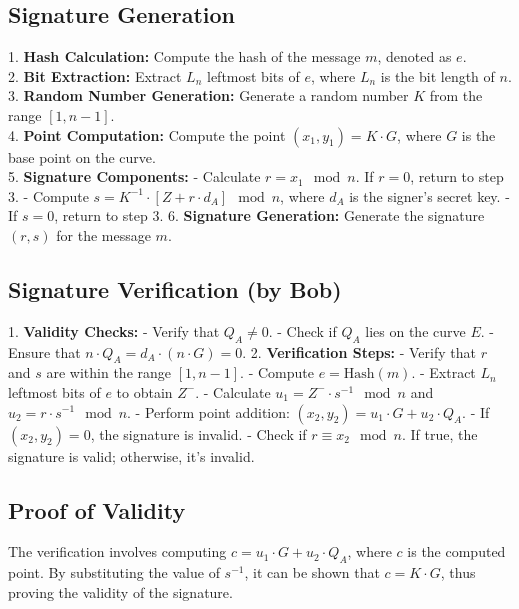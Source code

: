 \documentclass[11pt]{article}
\begin{document}
\subsection{Signature Generation}
1. \textbf{Hash Calculation:} Compute the hash of the message \( m \), denoted as \( e \). \\
2. \textbf{Bit Extraction:} Extract \( L_n \) leftmost bits of \( e \), where \( L_n \) is the bit length of \( n \). \\
3. \textbf{Random Number Generation:} Generate a random number \( K \) from the range \([1, n-1]\). \\
4. \textbf{Point Computation:} Compute the point \((x_1, y_1) = K \cdot G\), where \( G \) is the base point on the curve. \\
5. \textbf{Signature Components:}
   - Calculate \( r = x_1 \mod n \). If \( r = 0 \), return to step 3.
   - Compute \( s = K^{-1} \cdot [Z + r \cdot d_A] \mod n \), where \( d_A \) is the signer's secret key.
   - If \( s = 0 \), return to step 3.
6. \textbf{Signature Generation:} Generate the signature \((r, s)\) for the message \( m \).

\subsection{Signature Verification (by Bob)}
1. \textbf{Validity Checks:}
   - Verify that \( Q_A \neq 0 \).
   - Check if \( Q_A \) lies on the curve \( E \).
   - Ensure that \( n \cdot Q_A = d_A \cdot (n \cdot G) = 0 \).
2. \textbf{Verification Steps:}
   - Verify that \( r \) and \( s \) are within the range \([1, n-1]\).
   - Compute \( e = \text{Hash}(m) \).
   - Extract \( L_n \) leftmost bits of \( e \) to obtain \( Z^- \).
   - Calculate \( u_1 = Z^- \cdot s^{-1} \mod n \) and \( u_2 = r \cdot s^{-1} \mod n \).
   - Perform point addition: \((x_2, y_2) = u_1 \cdot G + u_2 \cdot Q_A\).
   - If \((x_2, y_2) = 0\), the signature is invalid.
   - Check if \( r \equiv x_2 \mod n \). If true, the signature is valid; otherwise, it's invalid.

\subsection{Proof of Validity}
The verification involves computing \( c = u_1 \cdot G + u_2 \cdot Q_A \), where \( c \) is the computed point. By substituting the value of \( s^{-1} \), it can be shown that \( c = K \cdot G \), thus proving the validity of the signature.
\end{document}
